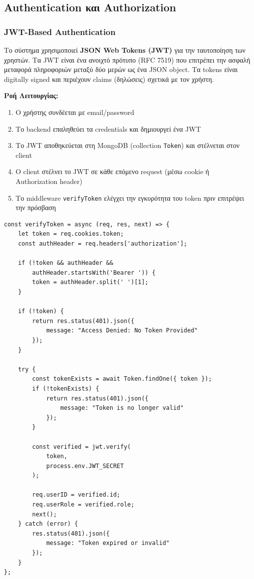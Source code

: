 \documentclass[a4paper,12pt]{article}
\begin{document}
\subsection{Authentication και Authorization}

\subsubsection{JWT-Based Authentication}

Το σύστημα χρησιμοποιεί \textbf{JSON Web Tokens (JWT)} για την ταυτοποίηση των χρηστών. Τα JWT είναι ένα ανοιχτό πρότυπο (RFC 7519) που επιτρέπει την ασφαλή μεταφορά πληροφοριών μεταξύ δύο μερών ως ένα JSON object. Τα tokens είναι digitally signed και περιέχουν claims (δηλώσεις) σχετικά με τον χρήστη.

\textbf{Ροή Λειτουργίας:}
\begin{enumerate}
    \item Ο χρήστης συνδέεται με email/password
    \item Το backend επαληθεύει τα credentials και δημιουργεί ένα JWT
    \item Το JWT αποθηκεύεται στη MongoDB (collection \texttt{Token}) και στέλνεται στον client
    \item Ο client στέλνει το JWT σε κάθε επόμενο request (μέσω cookie ή Authorization header)
    \item Το middleware \texttt{verifyToken} ελέγχει την εγκυρότητα του token πριν επιτρέψει την πρόσβαση
\end{enumerate}

\begin{verbatim}
const verifyToken = async (req, res, next) => {
    let token = req.cookies.token;
    const authHeader = req.headers['authorization'];
    
    if (!token && authHeader && 
        authHeader.startsWith('Bearer ')) {
        token = authHeader.split(' ')[1];
    }
    
    if (!token) {
        return res.status(401).json({ 
            message: "Access Denied: No Token Provided" 
        });
    }
    
    try {
        const tokenExists = await Token.findOne({ token });
        if (!tokenExists) {
            return res.status(401).json({ 
                message: "Token is no longer valid" 
            });
        }
        
        const verified = jwt.verify(
            token, 
            process.env.JWT_SECRET
        );
        
        req.userID = verified.id;
        req.userRole = verified.role;
        next();
    } catch (error) {
        res.status(401).json({ 
            message: "Token expired or invalid" 
        });
    }
};
\end{verbatim}
\end{document}
